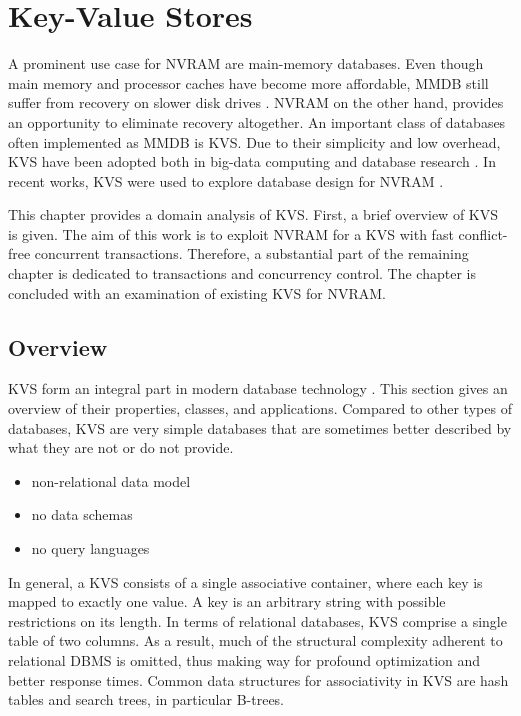 \chapter{Key-Value Stores}
\label{ch:kvs}

A prominent use case for NVRAM are main-memory databases. Even though main
memory and processor caches have become more affordable, MMDB still suffer from
recovery on slower disk drives \cite{oukid2015instant, schwalb2016hyrise}. NVRAM
on the other hand, provides an opportunity to eliminate recovery altogether. An
important class of databases often implemented as MMDB is KVS. Due to their
simplicity and low overhead, KVS have been adopted both in big-data computing
and database research \cite{decandia2007dynamo, lakshman2010cassandra,
wang2015hydradb}. In recent works, KVS were used to explore database design for
NVRAM \cite{bailey2013exploring, zhou2016nvht, wu2016nvmcached}.

This chapter provides a domain analysis of KVS. First, a brief overview of KVS
is given. The aim of this work is to exploit NVRAM for a KVS with fast
conflict-free concurrent transactions. Therefore, a substantial part of the
remaining chapter is dedicated to transactions and concurrency control. The
chapter is concluded with an examination of existing KVS for NVRAM.

\section{Overview}

KVS form an integral part in modern database technology \cite{fiebig2016one}.
This section gives an overview of their properties, classes, and applications.
Compared to other types of databases, KVS are very simple databases that are
sometimes better described by what they are not or do not provide.

\begin{itemize}
    \item non-relational data model
    \item no data schemas
    \item no query languages
\end{itemize}

In general, a KVS consists of a single associative container, where each key is
mapped to exactly one value. A key is an arbitrary string with possible
restrictions on its length. In terms of relational databases, KVS comprise a
single table of two columns. As a result, much of the structural complexity
adherent to relational DBMS is omitted, thus making way for profound
optimization and better response times. Common data structures for associativity
in KVS are hash tables and search trees, in particular B-trees.


